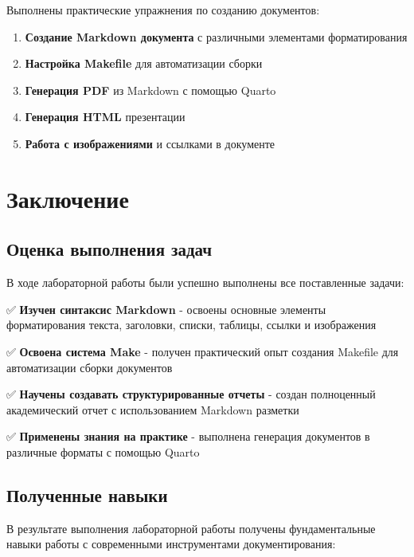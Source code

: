 \documentclass[
  12pt,
  a4paper,
  DIV=11,
  numbers=noendperiod]{scrreprt}
\providecommand{\tightlist}{%
  \setlength{\itemsep}{0pt}\setlength{\parskip}{0pt}}\usepackage{longtable,booktabs,array}
\begin{document}
Выполнены практические упражнения по созданию документов:

\begin{enumerate}
\def\labelenumi{\arabic{enumi}.}
\tightlist
\item
  \textbf{Создание Markdown документа} с различными элементами
  форматирования
\item
  \textbf{Настройка Makefile} для автоматизации сборки
\item
  \textbf{Генерация PDF} из Markdown с помощью Quarto
\item
  \textbf{Генерация HTML} презентации
\item
  \textbf{Работа с изображениями} и ссылками в документе
\end{enumerate}

\chapter{Заключение}\label{ux437ux430ux43aux43bux44eux447ux435ux43dux438ux435}

\section{Оценка выполнения
задач}\label{ux43eux446ux435ux43dux43aux430-ux432ux44bux43fux43eux43bux43dux435ux43dux438ux44f-ux437ux430ux434ux430ux447}

В ходе лабораторной работы были успешно выполнены все поставленные
задачи:

✅ \textbf{Изучен синтаксис Markdown} - освоены основные элементы
форматирования текста, заголовки, списки, таблицы, ссылки и изображения

✅ \textbf{Освоена система Make} - получен практический опыт создания
Makefile для автоматизации сборки документов

✅ \textbf{Научены создавать структурированные отчеты} - создан
полноценный академический отчет с использованием Markdown разметки

✅ \textbf{Применены знания на практике} - выполнена генерация
документов в различные форматы с помощью Quarto

\section{Полученные
навыки}\label{ux43fux43eux43bux443ux447ux435ux43dux43dux44bux435-ux43dux430ux432ux44bux43aux438}

В результате выполнения лабораторной работы получены фундаментальные
навыки работы с современными инструментами документирования:
\end{document}
